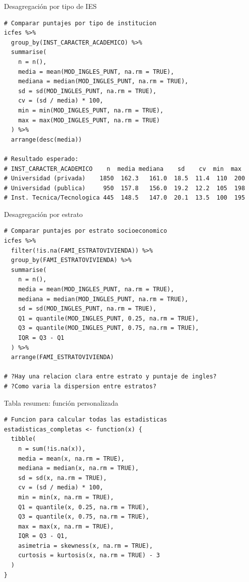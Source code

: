 \documentclass[aspectratio=169, 11pt]{beamer}
\begin{document}
\begin{frame}[fragile]{Desagregaci\'on por tipo de IES}
\begin{lstlisting}[basicstyle=\ttfamily\scriptsize]
# Comparar puntajes por tipo de institucion
icfes %>%
  group_by(INST_CARACTER_ACADEMICO) %>%
  summarise(
    n = n(),
    media = mean(MOD_INGLES_PUNT, na.rm = TRUE),
    mediana = median(MOD_INGLES_PUNT, na.rm = TRUE),
    sd = sd(MOD_INGLES_PUNT, na.rm = TRUE),
    cv = (sd / media) * 100,
    min = min(MOD_INGLES_PUNT, na.rm = TRUE),
    max = max(MOD_INGLES_PUNT, na.rm = TRUE)
  ) %>%
  arrange(desc(media))

# Resultado esperado:
# INST_CARACTER_ACADEMICO    n  media mediana    sd    cv  min  max
# Universidad (privada)    1850  162.3   161.0  18.5  11.4  110  200
# Universidad (publica)     950  157.8   156.0  19.2  12.2  105  198
# Inst. Tecnica/Tecnologica 445  148.5   147.0  20.1  13.5  100  195
\end{lstlisting}
\end{frame}

\begin{frame}[fragile]{Desagregación por estrato}
\begin{lstlisting}
# Comparar puntajes por estrato socioeconomico
icfes %>%
  filter(!is.na(FAMI_ESTRATOVIVIENDA)) %>%
  group_by(FAMI_ESTRATOVIVIENDA) %>%
  summarise(
    n = n(),
    media = mean(MOD_INGLES_PUNT, na.rm = TRUE),
    mediana = median(MOD_INGLES_PUNT, na.rm = TRUE),
    sd = sd(MOD_INGLES_PUNT, na.rm = TRUE),
    Q1 = quantile(MOD_INGLES_PUNT, 0.25, na.rm = TRUE),
    Q3 = quantile(MOD_INGLES_PUNT, 0.75, na.rm = TRUE),
    IQR = Q3 - Q1
  ) %>%
  arrange(FAMI_ESTRATOVIVIENDA)

# ?Hay una relacion clara entre estrato y puntaje de ingles?
# ?Como varia la dispersion entre estratos?
\end{lstlisting}
\end{frame}

\begin{frame}[fragile]{Tabla resumen: función personalizada}
\begin{lstlisting}
# Funcion para calcular todas las estadisticas
estadisticas_completas <- function(x) {
  tibble(
    n = sum(!is.na(x)),
    media = mean(x, na.rm = TRUE),
    mediana = median(x, na.rm = TRUE),
    sd = sd(x, na.rm = TRUE),
    cv = (sd / media) * 100,
    min = min(x, na.rm = TRUE),
    Q1 = quantile(x, 0.25, na.rm = TRUE),
    Q3 = quantile(x, 0.75, na.rm = TRUE),
    max = max(x, na.rm = TRUE),
    IQR = Q3 - Q1,
    asimetria = skewness(x, na.rm = TRUE),
    curtosis = kurtosis(x, na.rm = TRUE) - 3
  )
}
\end{lstlisting}
\end{frame}
\end{document}
